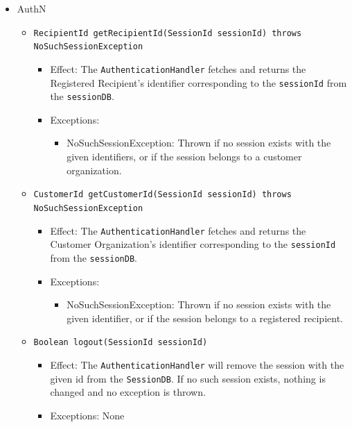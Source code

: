 \documentclass[a4paper,10pt]{article}
\begin{document}
\begin{itemize}
    \item AuthN
    \begin{itemize}
        \item \texttt{RecipientId getRecipientId(SessionId sessionId) throws NoSuchSessionException}
        \begin{itemize}
            \item Effect: The \texttt{AuthenticationHandler} fetches and returns the Registered Recipient's identifier corresponding to the \texttt{sessionId} from the \texttt{sessionDB}.
            \item Exceptions:
            \begin{itemize}
                \item NoSuchSessionException: Thrown if no session exists with the given identifiers, or if the session belongs to a customer organization.
            \end{itemize}
		\end{itemize}
		
        \item \texttt{CustomerId getCustomerId(SessionId sessionId) throws NoSuchSessionException}
        \begin{itemize}
             \item Effect: The \texttt{AuthenticationHandler} fetches and returns the Customer Organization's identifier corresponding to the \texttt{sessionId} from the \texttt{sessionDB}.
             \item Exceptions:
             \begin{itemize}
                \item NoSuchSessionException: Thrown if no session exists with the given identifier, or if the session belongs to a registered recipient.
             \end{itemize}
        \end{itemize}
        
        \item \texttt{Boolean logout(SessionId sessionId)}
        \begin{itemize}
            \item Effect: The \texttt{AuthenticationHandler} will remove the session with the given id from the \texttt{SessionDB}. If no such session exists, nothing is changed and no exception is thrown.
            \item Exceptions: None
        \end{itemize}
        

\end{itemize}
\end{itemize}
\end{document}
